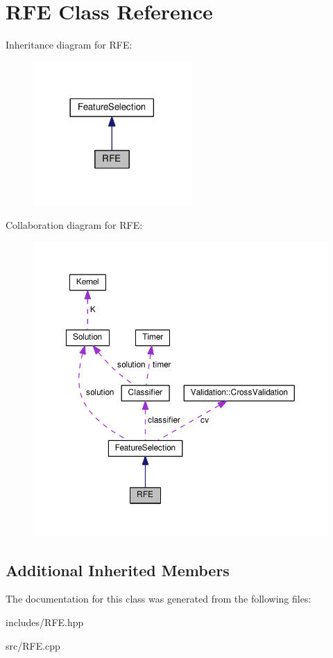 \hypertarget{class_r_f_e}{}\section{R\+FE Class Reference}
\label{class_r_f_e}


Inheritance diagram for R\+FE\+:
\nopagebreak
\begin{figure}[H]
\begin{center}
\leavevmode
\includegraphics[width=170pt]{class_r_f_e__inherit__graph}
\end{center}
\end{figure}


Collaboration diagram for R\+FE\+:
\nopagebreak
\begin{figure}[H]
\begin{center}
\leavevmode
\includegraphics[width=350pt]{class_r_f_e__coll__graph}
\end{center}
\end{figure}
\subsection*{Additional Inherited Members}


The documentation for this class was generated from the following files\+:\begin{DoxyCompactItemize}
\item 
includes/R\+F\+E.\+hpp\item 
src/R\+F\+E.\+cpp\end{DoxyCompactItemize}
